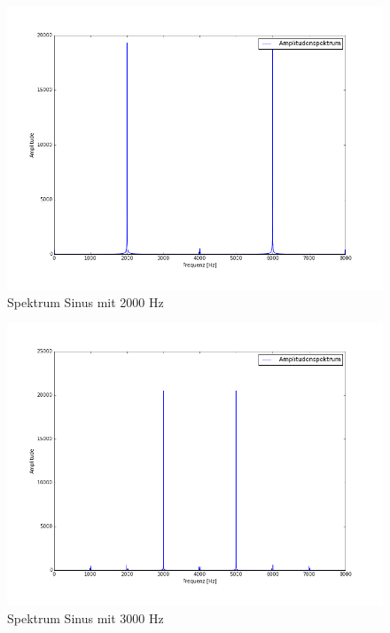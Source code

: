 \documentclass[12pt,oneside,a4paper]{report}
\begin{document}
\begin{figure}[H]
\centering\small
\includegraphics[scale=0.4]{src/2000fft.png}
\caption{Spektrum Sinus mit 2000 Hz}
\label{fig:2000_FFT}
\end{figure}

\begin{figure}[H]
\centering\small
\includegraphics[scale=0.4]{src/3000fft.png}
\caption{Spektrum Sinus mit 3000 Hz}
\label{fig:3000_FFT}
\end{figure}
\end{document}

